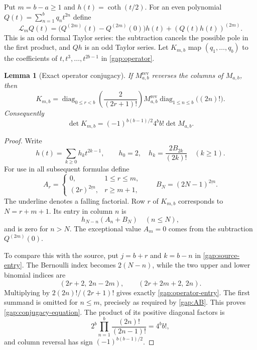 \documentclass[11pt,letterpaper]{article}
\numberwithin{equation}{section}
\theoremstyle{plain}
\newtheorem{lemma}[theorem]{Lemma}
\theoremstyle{definition}
\theoremstyle{remark}
\begin{document}
Put $m=b-a\ge1$ and $h(t)=\coth(t/2)$. For an even polynomial
$Q(t)=\sum_{n=1}^b q_nt^{2n}$ define
\begin{equation}\label{gap:operator}
 \mathcal L_mQ(t)
 =\bigl(Q^{(2m)}(t)-Q^{(2m)}(0)\bigr)h(t)
                      +(Q(t)h(t))^{(2m)}.
\end{equation}
This is an odd formal Taylor series: the subtraction cancels the
possible pole in the first product, and $Qh$ is an odd Taylor series.
Let $K_{m,b}$ map $(q_1,\ldots,q_b)$ to the coefficients of
$t,t^3,\ldots,t^{2b-1}$ in \eqref{gap:operator}.

\begin{lemma}[Exact operator conjugacy]\label{gap:conjugacy}
If $M_{a,b}^{\mathrm{rev}}$ reverses the columns of $M_{a,b}$, then
\begin{equation}\label{gap:conjugacy-equation}
 K_{m,b}=
 \operatorname{diag}_{0\le r<b}\!\left(\frac2{(2r+1)!}\right)
 M_{a,b}^{\mathrm{rev}}
 \operatorname{diag}_{1\le n\le b}\!\bigl((2n)!\bigr).
\end{equation}
Consequently
\begin{equation}\label{gap:conjugacy-determinant}
 \det K_{m,b}=(-1)^{b(b-1)/2}4^bb!\det M_{a,b}.
\end{equation}
\end{lemma}

\begin{proof}
Write
\[
 h(t)=\sum_{k\ge0}h_kt^{2k-1},\qquad
 h_0=2,\quad h_k=\frac{2B_{2k}}{(2k)!}\quad(k\ge1).
\]
For use in all subsequent formulas define
\begin{equation}\label{gap:AB}
 A_r=\begin{cases}0,&1\le r\le m,\\
 (2r)^{\underline{2m}},&r\ge m+1,
 \end{cases}
 \qquad B_N=(2N-1)^{\underline{2m}}.
\end{equation}
The underline denotes a falling factorial. Row $r$ of $K_{m,b}$
corresponds to $N=r+m+1$. Its entry in column $n$ is
\begin{equation}\label{gap:operator-entry}
 h_{N-n}(A_n+B_N)\quad(n\le N),
\end{equation}
and is zero for $n>N$. The exceptional value $A_m=0$ comes from
the subtraction $Q^{(2m)}(0)$.

To compare this with the source, put $j=b+r$ and $k=b-n$ in
\eqref{gap:source-entry}. The Bernoulli index becomes $2(N-n)$,
while the two upper and lower binomial indices are
\[
 (2r+2,\,2n-2m),\qquad(2r+2m+2,\,2n).
\]
Multiplying by $2(2n)!/(2r+1)!$ gives exactly
\eqref{gap:operator-entry}. The first summand is omitted for
$n\le m$, precisely as required by \eqref{gap:AB}. This proves
\eqref{gap:conjugacy-equation}. The product of its positive diagonal
factors is
\[
 2^b\prod_{n=1}^b\frac{(2n)!}{(2n-1)!}=4^bb!,
\]
and column reversal has sign $(-1)^{b(b-1)/2}$.
\end{proof}
\end{document}
